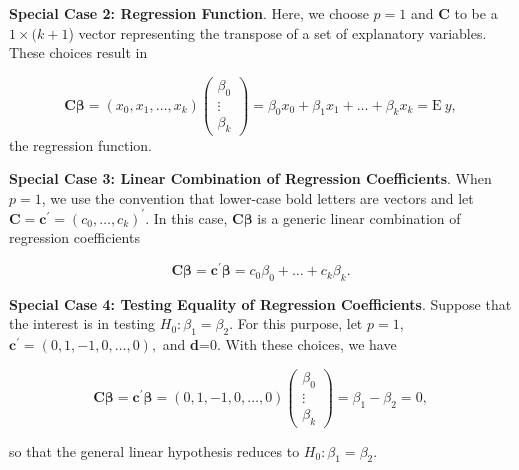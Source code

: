 \textbf{Special Case 2: Regression Function}. Here, we choose $p=1$
and \textbf{C} to be a $1\times (k+1$) vector representing the
transpose of a set of explanatory variables. These choices result in

\begin{equation*}
\mathbf{C \boldsymbol \beta =}\left(x_0,x_1, \ldots, x_k \right)
\left(
\begin{array}{c}
\beta_0 \\
\vdots  \\
\beta_k
\end{array}
\right) = \beta_0 x_0 + \beta_1 x_1 +\ldots + \beta_k x_k =
\mathrm{E} ~y,
\end{equation*}
the regression function.

\textbf{Special Case 3: Linear Combination of Regression
Coefficients}. When $p=1$, we use the convention that lower-case
bold letters are vectors and let $\mathbf{C = c^{\prime}}=
\left(c_0, \ldots, c_k \right)^{\prime}$. In this case, $\mathbf{C}
\boldsymbol \beta$ is a generic linear combination of regression
coefficients

\begin{equation*}
\mathbf{C} \boldsymbol \beta =\mathbf{c}^{\prime} \boldsymbol \beta
= c_0 \beta_0 + \ldots + c_k \beta_k.
\end{equation*}

\bigskip

\textbf{Special Case 4: Testing Equality of Regression
Coefficients}. Suppose that the interest is in testing $H_0: \beta_1
= \beta_2.$ For this purpose, let $p=1$, $\mathbf{c}^{\prime}=
\left(0,1, -1, 0, \ldots, 0\right),$ and \textbf{d}=0. With these
choices, we have

\begin{equation*}
\mathbf{C \boldsymbol \beta = c^{\prime} \boldsymbol \beta}=
\left(0,1, -1, 0, \ldots, 0\right) \left(
\begin{array}{c}
\beta_0 \\
\vdots  \\
\beta_k
\end{array}
\right) =\beta_1 - \beta_2 = 0,
\end{equation*}

\noindent so that the general linear hypothesis reduces to $H_0:
\beta_1 = \beta_2.$


